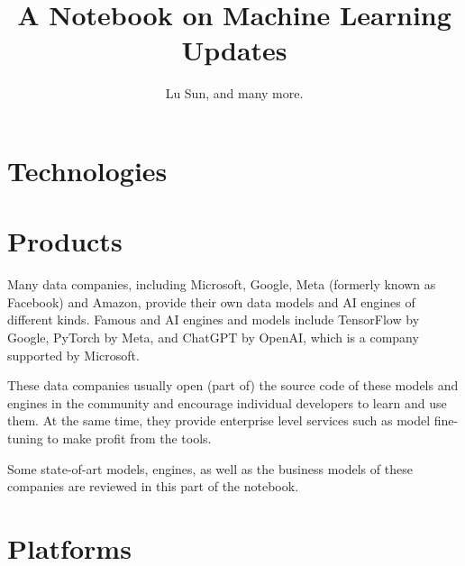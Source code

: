



\makeindex



\frontmatter

\title{A Notebook on Machine Learning Updates}
\author{Lu Sun, and many more.}

\maketitle


\tableofcontents


\listoffigures
\listoftables

\mainmatter

\part{Technologies}







\part{Products}

Many data companies, including Microsoft, Google, Meta (formerly known as Facebook) and Amazon, provide their own data models and AI engines of different kinds. Famous and AI engines and models include TensorFlow by Google, PyTorch by Meta, and ChatGPT by OpenAI, which is a company supported by Microsoft.

These data companies usually open (part of) the source code of these models and engines in the community and encourage individual developers to learn and use them. At the same time, they provide enterprise level services such as model fine-tuning to make profit from the tools.

Some state-of-art models, engines, as well as the business models of these companies are reviewed in this part of the notebook.







\part{Platforms}






\printindex


